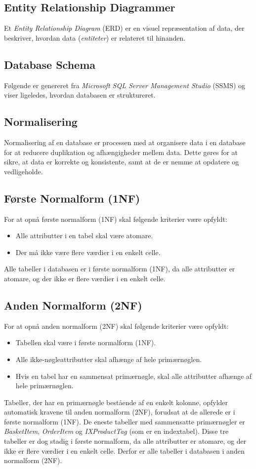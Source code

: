 \subsection{Entity Relationship Diagrammer}
Et \emph{Entity Relationship Diagram} (ERD) er en visuel repræsentation af data, der beskriver, hvordan data (\emph{entiteter}) er relateret til hinanden.

\subsection{Database Schema}
Følgende er genereret fra \emph{Microsoft SQL Server Management Studio} (SSMS) og viser ligeledes, hvordan databasen er struktureret.

\subsection{Normalisering}
\label{sec:normalisering}
Normalisering af en database er processen med at organisere data i en database for at reducere duplikation og afhængigheder mellem data. 
Dette gøres for at sikre, at data er korrekte og konsistente, samt at de er nemme at opdatere og vedligeholde.

\subsection{Første Normalform (1NF)}
For at opnå første normalform (1NF) skal følgende kriterier være opfyldt:
\begin{itemize}
    \item Alle attributter i en tabel skal være atomare.
    \item Der må ikke være flere værdier i en enkelt celle.
\end{itemize}
Alle tabeller i databasen er i første normalform (1NF), da alle attributter er atomare, og der ikke er flere værdier i en enkelt celle.

\subsection{Anden Normalform (2NF)}
For at opnå anden normalform (2NF) skal følgende kriterier være opfyldt:
\begin{itemize}
    \item Tabellen skal være i første normalform (1NF).
    \item Alle ikke-nøgleattributter skal afhænge af hele primærnøglen.
    \item Hvis en tabel har en sammensat primærnøgle, skal alle attributter afhænge af hele primærnøglen.
\end{itemize}
Tabeller, der har en primærnøgle bestående af en enkelt kolonne, opfylder automatisk kravene til anden normalform (2NF), forudsat at de allerede er i første normalform (1NF).
De eneste tabeller med sammensatte primærnøgler er \emph{BasketItem}, \emph{OrderItem} og \emph{IXProductTag} (som er en indextabel).
Disse tre tabeller er dog stadig i første normalform, da alle attributter er atomare, og der ikke er flere værdier i en enkelt celle.
Derfor er alle tabeller i databasen i anden normalform (2NF).

